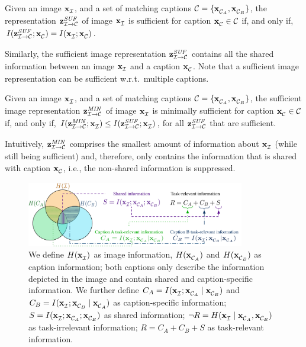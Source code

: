 \begin{definition}
	\label{def:suff_img_repr}		
	Given an image $\img{}{}$, and a set of matching captions $\mathcal{C} = \{ \capt{}{A}, \capt{}{B} \}$,
	the representation $\zimgsuff{}$ of image $\img{}{}$ is sufficient for caption $\capt{}{} \in \mathcal{C}$ if, and only if,  $I(\zimgsuff{}; \capt{}{} ) = I(\img{}{} ; \capt{}{})$.
\end{definition}

Similarly, the sufficient image representation $\zimgsuff{}$ contains all the shared information between an image $\img{}{}$ and a caption $\capt{}{}$. 
Note that a sufficient image representation can be sufficient w.r.t.\ multiple captions.

\begin{definition}
	\label{def:zimgminsuff}		
	Given an image $\img{}{}$, and a set of matching captions $\mathcal{C} = \{ \capt{}{A}, \capt{}{B} \}$,
	the sufficient image representation $\zminsuff{}$ of image $\img{}{}$  is minimally sufficient for caption $\capt{}{} \in \mathcal{C}$ if, and only if, $I(\zminsuff{}; \img{}{}) \leq I(\zimgsuff{}; \img{}{})$, for all $\zimgsuff{}$ that are sufficient.
\end{definition}
Intuitively, $\zminsuff{}$ comprises the smallest amount of information about $\img{}{}$ (while still being sufficient) and, therefore, only contains the information that is shared with caption $\capt{}{}$, i.e., the non-shared information is suppressed.

\begin{figure}[t!]
	\centering
	\includegraphics[width=0.85\textwidth]{figures/information-venn-diagram}
	\caption{
		We define $H(\img{}{})$ as image information, $H(\capt{}{A})$ and $H(\capt{}{B})$ as caption information;
		both captions only describe the information depicted in the image and contain shared and caption-specific information.
		We further define
		$C_A = I( \img{}{} ; \capt{}{A} \mid \capt{}{B})$
		and
		$C_B = I( \img{}{} ; \capt{}{B} \mid \capt{}{A})$ as caption-specific information; 
		$S = I(\img{}{} ; \capt{}{A} ; \capt{}{B})$ as shared information;
		$\neg R = H( \img{}{} \mid \capt{}{A} , \capt{}{B} ) $ as task-irrelevant information;
		$R = C_A + C_B + S$ as task-relevant information.
	}
	\label{fig:venn}
\end{figure} 

